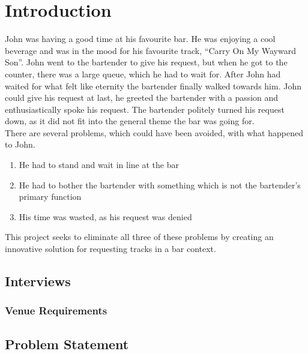 \chapter{Introduction}
John was having a good time at his favourite bar. He was enjoying a cool beverage and was in the mood for his favourite track, \enquote{Carry On My Wayward Son}. John went to the bartender to give his request, but when he got to the counter, there was a large queue, which he had to wait for. After John had waited for what felt like eternity the bartender finally walked towards him. John could give his request at last, he greeted the bartender with a passion and enthusiastically spoke his request. The bartender politely turned his request down, as it did not fit into the general theme the bar was going for.\\

There are several problems, which could have been avoided, with what happened to John.
\begin{enumerate}
	\item He had to stand and wait in line at the bar
	\item He had to bother the bartender with something which is not the bartender's primary function
	\item His time was wasted, as his request was denied
\end{enumerate}
This project seeks to eliminate all three of these problems by creating an innovative solution for requesting tracks in a bar context.

\section{Interviews}





\subsection{Venue Requirements}


\section{Problem Statement}
\label{ProblemStatement}

